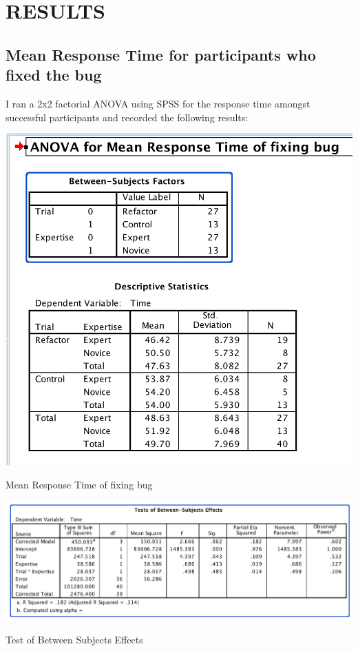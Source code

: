 \graphicspath{{./images/ch5/}}
\chapter{RESULTS}

\section{Mean Response Time for participants who fixed the bug}

I ran a 2x2 factorial ANOVA using SPSS for the response time amongst successful participants and recorded the following results:

\begin{table}[h]
	\centering
	\includegraphics[scale = .5]{meanResponseTime}
	\caption{Mean Response Time of fixing bug}
\end{table}

\begin{table}[h]
	\centering
	\includegraphics[scale=.5]{betweenSubjectEffects1}
	\caption{Test of Between Subjects Effects}
\end{table}

